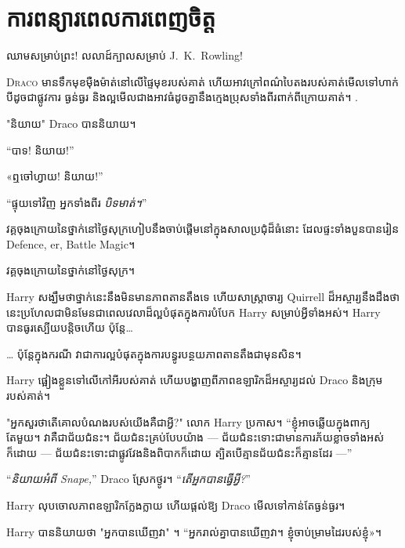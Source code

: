\chapter{ការពន្យារពេលការពេញចិត្ត}

\begin{chapterOpeningAuthorNote}
ឈាមសម្រាប់ព្រះ! លលាដ៍ក្បាលសម្រាប់ J.~K.~Rowling!
\end{chapterOpeningAuthorNote}

\lettrine{D}{raco} មាន​ទឹកមុខ​ម៉ឺងម៉ាត់​នៅលើ​ផ្ទៃមុខ​របស់គាត់ ហើយ​អាវ​ក្រៅ​ពណ៌​បៃតង​របស់គាត់​មើលទៅ​ហាក់បីដូចជា​ផ្លូវការ ធ្ងន់ធ្ងរ និង​ល្អមើល​ជាង​អាវធំ​ដូចគ្នា​នឹង​ក្មេងប្រុស​ទាំងពីរ​ពាក់​ពីក្រោយ​គាត់។ .

"និយាយ" Draco បាននិយាយ។

“បាទ! និយាយ!”

«ឮចៅហ្វាយ! និយាយ!”

“ផ្ទុយទៅវិញ អ្នកទាំងពីរ \emph{បិទមាត់។}”

វគ្គចុងក្រោយនៃថ្នាក់នៅថ្ងៃសុក្រហៀបនឹងចាប់ផ្តើមនៅក្នុងសាលប្រជុំដ៏ធំនោះ ដែលផ្ទះទាំងបួនបានរៀន Defence, er, Battle Magic។

វគ្គចុងក្រោយនៃថ្នាក់នៅថ្ងៃសុក្រ។

Harry សង្ឃឹម​ថា​ថ្នាក់​នេះ​នឹង​មិន​មាន​ភាព​តានតឹង​ទេ ហើយ​សាស្ត្រាចារ្យ Quirrell ដ៏​អស្ចារ្យ​នឹង​ដឹង​ថា នេះ​ប្រហែល​ជា​មិន​មែន​ជា​ពេល​វេលា​ដ៏​ល្អ​បំផុត​ក្នុង​ការ​បំបែក​ Harry សម្រាប់​អ្វី​ទាំង​អស់។ Harry បានធូរស្បើយបន្តិចហើយ ប៉ុន្តែ…

… ប៉ុន្តែក្នុងករណី វាជាការល្អបំផុតក្នុងការបន្ធូរបន្ថយភាពតានតឹងជាមុនសិន។

Harry ផ្អៀង​ខ្លួន​ទៅ​លើ​កៅអី​របស់​គាត់ ហើយ​បង្ហាញ​ពី​ភាព​ឧឡារិក​ដ៏​អស្ចារ្យ​ដល់ Draco និង​ក្រុម​របស់​គាត់។

"អ្នកសួរថាតើគោលបំណងរបស់យើងគឺជាអ្វី?" លោក Harry ប្រកាស។ “ខ្ញុំអាចឆ្លើយក្នុងពាក្យតែមួយ។ វាគឺជាជ័យជំនះ។ ជ័យជំនះគ្រប់បែបយ៉ាង — ជ័យជំនះទោះជាមានការភ័យខ្លាចទាំងអស់ក៏ដោយ — ជ័យជំនះទោះជាផ្លូវវែងនិងពិបាកក៏ដោយ ត្បិតបើគ្មានជ័យជំនះក៏គ្មានដែរ —”

“\emph{និយាយអំពី Snape,}” Draco ស្រែកថ្ងូរ។ “\emph{តើអ្នកបានធ្វើអ្វី?}”

Harry លុបចោលភាពឧឡារិកក្លែងក្លាយ ហើយផ្តល់ឱ្យ Draco មើលទៅកាន់តែធ្ងន់ធ្ងរ។

Harry បាននិយាយថា "អ្នកបានឃើញវា" ។ “អ្នក​រាល់​គ្នា​បាន​ឃើញ​វា។ ខ្ញុំ​ចាប់​ម្រាមដៃ​របស់​ខ្ញុំ»។


